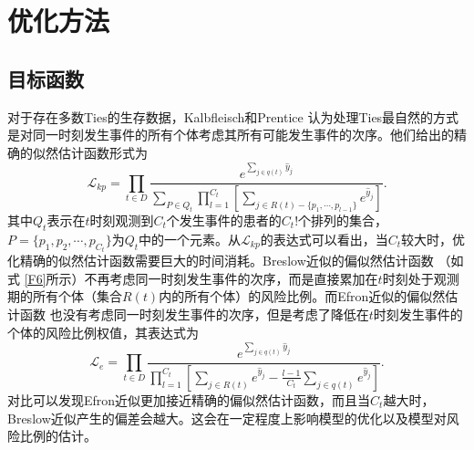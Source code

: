 \section{优化方法}

\subsection{目标函数}

对于存在多数Ties的生存数据，Kalbfleisch和Prentice  认为处理Ties最自然的方式是对同一时刻发生事件的所有个体考虑其所有可能发生事件的次序。他们给出的精确的似然估计函数形式为
\begin{equation}
\mathcal{L}_{kp} = \prod_{t\in D} \frac{e^{\sum_{j\in q(t)} \hat{y}_j}}{\sum_{P\in Q_t} \prod_{l=1}^{C_t} [\sum_{j \in R(t)-\{p_1,\cdots ,p_{l-1}\}} e^{\hat{y}_j}]}.
\end{equation}
其中$Q_t$表示在$t$时刻观测到$C_t$个发生事件的患者的$C_t!$个排列的集合，$P=\{p_1,p_2,\cdots ,p_{C_t}\}$为$Q_t$中的一个元素。从$\mathcal{L}_{kp}$的表达式可以看出，当$C_t$较大时，优化精确的似然估计函数需要巨大的时间消耗。Breslow近似的偏似然估计函数 （如式 \eqref{F6}所示）不再考虑同一时刻发生事件的次序，而是直接累加在$t$时刻处于观测期的所有个体（集合$R(t)$内的所有个体）的风险比例。而Efron近似的偏似然估计函数 也没有考虑同一时刻发生事件的次序，但是考虑了降低在$t$时刻发生事件的个体的风险比例权值，其表达式为
\begin{equation}
\mathcal{L}_{e} = \prod_{t\in D} \frac{e^{\sum_{j\in q(t)} \hat{y}_j}}{\prod_{l=1}^{C_t} \left[\sum_{j \in R(t)} e^{\hat{y}_j} - \frac{l-1}{C_t} \sum_{j \in q(t)} e^{\hat{y}_j} \right]}.
\end{equation}
对比可以发现Efron近似更加接近精确的偏似然估计函数，而且当$C_t$越大时，Breslow近似产生的偏差会越大。这会在一定程度上影响模型的优化以及模型对风险比例的估计。


